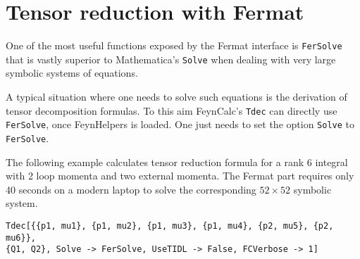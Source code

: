 \documentclass[../FeynHelpersManual.tex]{subfiles}
\begin{document}
\hypertarget{tensor reduction with fermat}{
\section{Tensor reduction with Fermat}\label{tensor reduction with fermat}}

One of the most useful functions exposed by the Fermat interface is
\texttt{FerSolve} that is vastly superior to Mathematica's
\texttt{Solve} when dealing with very large symbolic systems of
equations.

A typical situation where one needs to solve such equations is the
derivation of tensor decomposition formulas. To this aim FeynCalc's
\texttt{Tdec} can directly use \texttt{FerSolve}, once FeynHelpers is
loaded. One just needs to set the option \texttt{Solve} to
\texttt{FerSolve}.

The following example calculates tensor reduction formula for a rank 6
integral with 2 loop momenta and two external momenta. The Fermat part
requires only 40 seconds on a modern laptop to solve the corresponding
\(52 \times 52\) symbolic system.

\begin{verbatim}
Tdec[{{p1, mu1}, {p1, mu2}, {p1, mu3}, {p1, mu4}, {p2, mu5}, {p2, mu6}},
{Q1, Q2}, Solve -> FerSolve, UseTIDL -> False, FCVerbose -> 1]
\end{verbatim}
\end{document}
